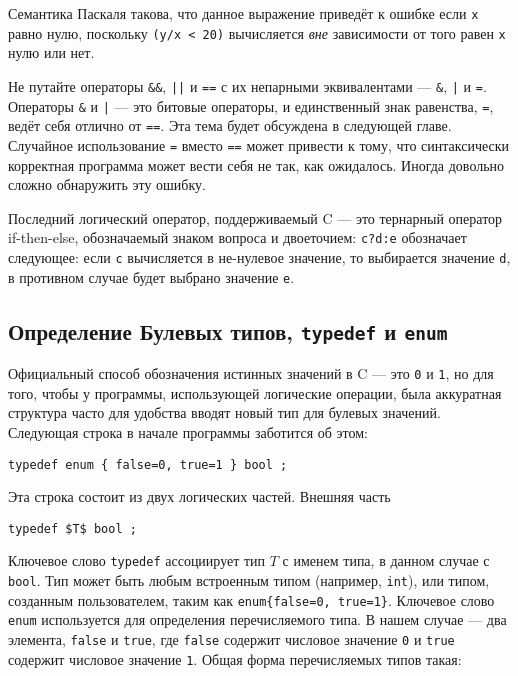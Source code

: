 Семантика Паскаля такова, что данное выражение приведёт к ошибке если \lstinline|x| равно нулю, поскольку \lstinline|(y/x < 20)| вычисляется \emph{вне} зависимости от того равен \lstinline|x| нулю или нет.

Не путайте операторы \lstinline|&&|, \lstinline!||! и \lstinline|==| с их непарными эквивалентами --- \lstinline!&!, \lstinline!|! и \lstinline|=|. Операторы \lstinline!&! и \lstinline!|! --- это битовые операторы, и единственный знак равенства, \lstinline|=|, ведёт себя отлично от \lstinline|==|. Эта тема будет обсуждена в следующей главе. Случайное использование \lstinline|=| вместо \lstinline|==| может привести к тому, что синтаксически корректная программа может вести себя не так, как ожидалось. Иногда довольно сложно обнаружить эту ошибку.

Последний логический оператор, поддерживаемый C --- это тернарный оператор if-then-else, обозначаемый знаком вопроса и двоеточием: \lstinline|c?d:e| обозначает следующее: если \lstinline|c| вычисляется в не-нулевое значение, то выбирается значение \lstinline|d|, в противном случае будет выбрано значение \lstinline|e|.

\subsection{Определение Булевых типов, \lstinline|typedef| и \lstinline|enum|}\label{BoolTypedefEnum}

Официальный способ обозначения истинных значений в C --- это \lstinline|0| и \lstinline|1|, но для того, чтобы у программы, использующей логические операции, была аккуратная структура часто для удобства вводят новый тип для булевых значений. Следующая строка в начале программы заботится об этом:

\begin{lstlisting}
typedef enum { false=0, true=1 } bool ;
\end{lstlisting}

Эта строка состоит из двух логических частей. Внешняя часть

\begin{lstlisting}
typedef $T$ bool ;
\end{lstlisting}

Ключевое слово \lstinline|typedef| ассоциирует тип $T$ с именем типа, в данном случае с \lstinline|bool|. Тип может быть любым встроенным типом (например, \lstinline|int|), или типом, созданным пользователем, таким как \lstinline|enum{false=0, true=1}|. Ключевое слово \lstinline|enum| используется для определения перечисляемого типа. В нашем случае --- два элемента, \lstinline|false| и \lstinline|true|, где \lstinline|false| содержит числовое значение \lstinline|0| и \lstinline|true| содержит числовое значение \lstinline|1|. Общая форма перечисляемых типов такая:

